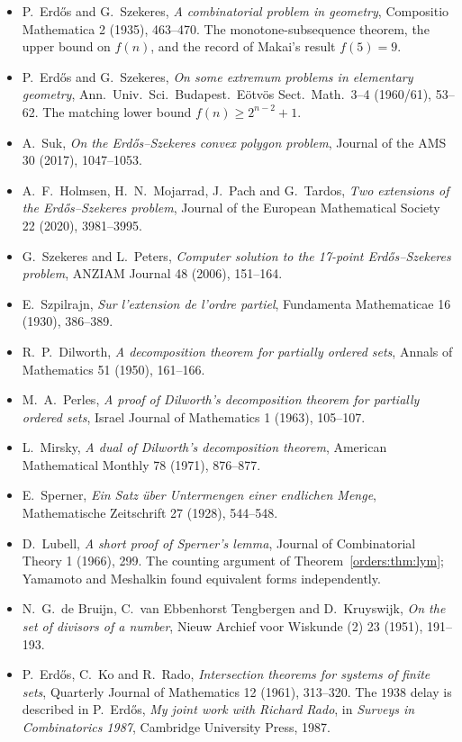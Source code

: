 \begin{itemize}\raggedright
\item P.~Erd\H os and G.~Szekeres, \emph{A combinatorial problem in geometry}, Compositio Mathematica 2 (1935), 463--470. The monotone-subsequence theorem, the upper bound on $f(n)$, and the record of Makai's result $f(5)=9$.
\item P.~Erd\H os and G.~Szekeres, \emph{On some extremum problems in elementary geometry}, Ann.\ Univ.\ Sci.\ Budapest.\ E\"otv\"os Sect.\ Math.\ 3--4 (1960/61), 53--62. The matching lower bound $f(n)\ge 2^{n-2}+1$.
\item A.~Suk, \emph{On the Erd\H os--Szekeres convex polygon problem}, Journal of the AMS 30 (2017), 1047--1053.
\item A.~F.~Holmsen, H.~N.~Mojarrad, J.~Pach and G.~Tardos, \emph{Two extensions of the Erd\H os--Szekeres problem}, Journal of the European Mathematical Society 22 (2020), 3981--3995.
\item G.~Szekeres and L.~Peters, \emph{Computer solution to the 17-point Erd\H os--Szekeres problem}, ANZIAM Journal 48 (2006), 151--164.
\item E.~Szpilrajn, \emph{Sur l'extension de l'ordre partiel}, Fundamenta Mathematicae 16 (1930), 386--389.
\item R.~P.~Dilworth, \emph{A decomposition theorem for partially ordered sets}, Annals of Mathematics 51 (1950), 161--166.
\item M.~A.~Perles, \emph{A proof of Dilworth's decomposition theorem for partially ordered sets}, Israel Journal of Mathematics 1 (1963), 105--107.
\item L.~Mirsky, \emph{A dual of Dilworth's decomposition theorem}, American Mathematical Monthly 78 (1971), 876--877.
\item E.~Sperner, \emph{Ein Satz \"uber Untermengen einer endlichen Menge}, Mathematische Zeitschrift 27 (1928), 544--548.
\item D.~Lubell, \emph{A short proof of Sperner's lemma}, Journal of Combinatorial Theory 1 (1966), 299. The counting argument of Theorem~\ref{orders:thm:lym}; Yamamoto and Meshalkin found equivalent forms independently.
\item N.~G.~de Bruijn, C.~van Ebbenhorst Tengbergen and D.~Kruyswijk, \emph{On the set of divisors of a number}, Nieuw Archief voor Wiskunde (2) 23 (1951), 191--193.
\item P.~Erd\H os, C.~Ko and R.~Rado, \emph{Intersection theorems for systems of finite sets}, Quarterly Journal of Mathematics 12 (1961), 313--320. The $1938$ delay is described in P.~Erd\H os, \emph{My joint work with Richard Rado}, in \emph{Surveys in Combinatorics 1987}, Cambridge University Press, 1987.

\end{itemize}
